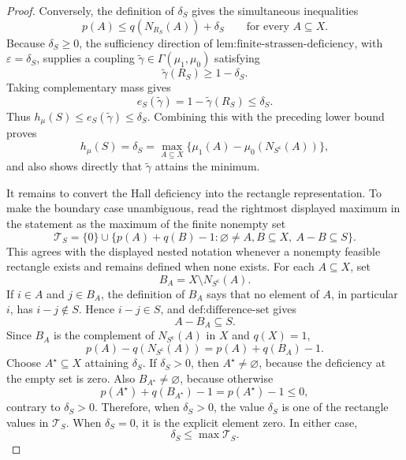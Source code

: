 \documentclass{article}
\begin{document}
\begin{proof}
Conversely, the definition of \(\delta_S\) gives the simultaneous inequalities
\[
p(A)\leq q(N_{R_S}(A))+\delta_S
\qquad\text{for every }A\subseteq X.
\]
Because \(\delta_S\geq0\), the sufficiency direction of \(\text{lem:finite-strassen-deficiency}\), with \(\varepsilon=\delta_S\), supplies a coupling \(\widetilde\gamma\in\Gamma(\mu_1,\mu_0)\) satisfying
\[
\widetilde\gamma(R_S)\geq1-\delta_S.
\]
Taking complementary mass gives
\[
e_S(\widetilde\gamma)=1-\widetilde\gamma(R_S)\leq\delta_S.
\]
Thus \(h_\mu(S)\leq e_S(\widetilde\gamma)\leq\delta_S\).  Combining this with the preceding lower bound proves
\[
h_\mu(S)=\delta_S
=\max_{A\subseteq X}\{\mu_1(A)-\mu_0(N_{S^{\mathsf c}}(A))\},
\]
and also shows directly that \(\widetilde\gamma\) attains the minimum.

It remains to convert the Hall deficiency into the rectangle representation.  To make the boundary case unambiguous, read the rightmost displayed maximum in the statement as the maximum of the finite nonempty set
\[
\mathcal T_S=\{0\}\cup
\{p(A)+q(B)-1:\varnothing\neq A,B\subseteq X,\ A-B\subseteq S\}.
\]
This agrees with the displayed nested notation whenever a nonempty feasible rectangle exists and remains defined when none exists.  For each \(A\subseteq X\), set
\[
B_A=X\setminus N_{S^{\mathsf c}}(A).
\]
If \(i\in A\) and \(j\in B_A\), the definition of \(B_A\) says that no element of \(A\), in particular \(i\), has \(i-j\notin S\).  Hence \(i-j\in S\), and \(\text{def:difference-set}\) gives
\[
A-B_A\subseteq S.
\]
Since \(B_A\) is the complement of \(N_{S^{\mathsf c}}(A)\) in \(X\) and \(q(X)=1\),
\[
p(A)-q(N_{S^{\mathsf c}}(A))
=p(A)+q(B_A)-1.
\]
Choose \(A^\star\subseteq X\) attaining \(\delta_S\).  If \(\delta_S>0\), then \(A^\star\neq\varnothing\), because the deficiency at the empty set is zero.  Also \(B_{A^\star}\neq\varnothing\), because otherwise
\[
p(A^\star)+q(B_{A^\star})-1=p(A^\star)-1\leq0,
\]
contrary to \(\delta_S>0\).  Therefore, when \(\delta_S>0\), the value \(\delta_S\) is one of the rectangle values in \(\mathcal T_S\).  When \(\delta_S=0\), it is the explicit element zero.  In either case,
\[
\delta_S\leq\max\mathcal T_S.
\]


\end{proof}
\end{document}
